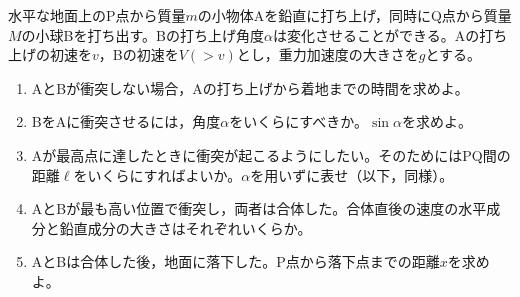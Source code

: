 \item
    \begin{mawarikomi}{120pt}{}
        水平な地面上のP点から質量$m$の小物体Aを鉛直に打ち上げ，同時にQ点から質量$M$の小球Bを打ち出す。Bの打ち上げ角度$\alpha $は変化させることができる。Aの打ち上げの初速を$v$，Bの初速を$V(>v)$とし，重力加速度の大きさを$g$とする。
        \begin{enumerate}
            \item AとBが衝突しない場合，Aの打ち上げから着地までの時間を求めよ。
            \item BをAに衝突させるには，角度$\alpha $をいくらにすべきか。$\sin{\alpha }$を求めよ。
            \item Aが最高点に達したときに衝突が起こるようにしたい。そのためにはPQ間の距離$\ell $をいくらにすればよいか。$\alpha $を用いずに表せ（以下，同様）。
            \item AとBが最も高い位置で衝突し，両者は合体した。合体直後の速度の水平成分と鉛直成分の大きさはそれぞれいくらか。
            \item AとBは合体した後，地面に落下した。P点から落下点までの距離$x$を求めよ。
        \end{enumerate}
    \end{mawarikomi}